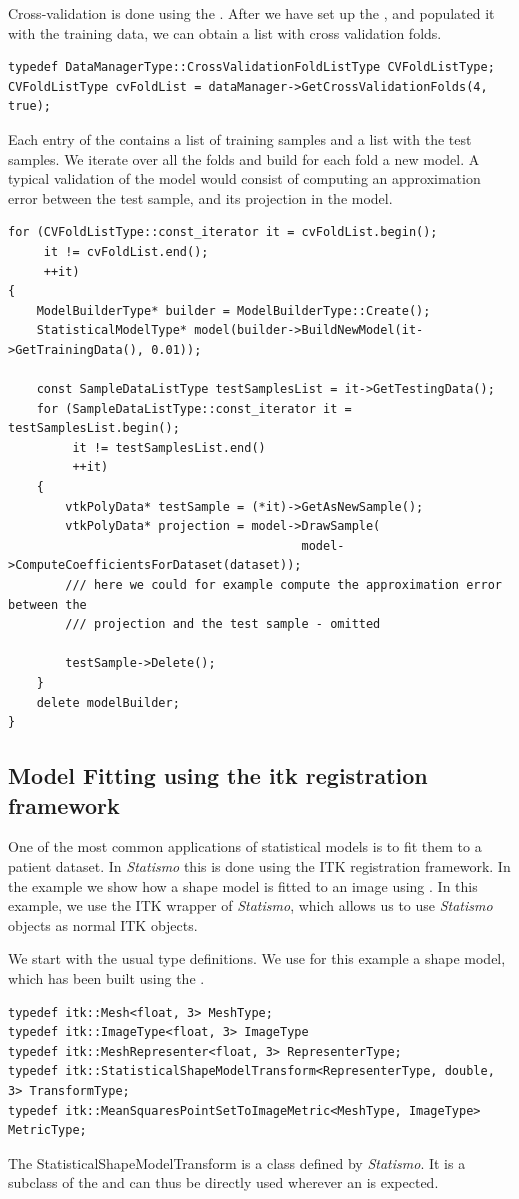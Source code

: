 \documentclass{InsightArticle}
\newcommand{\Statismo}{\emph{Statismo}\xspace}
\begin{document}
Cross-validation is done using the . 
After we have set up the , and populated it with the training data, we 
can obtain a list with cross validation folds. 
\begin{verbatim}
typedef DataManagerType::CrossValidationFoldListType CVFoldListType;
CVFoldListType cvFoldList = dataManager->GetCrossValidationFolds(4, true);
\end{verbatim}
Each entry of the  contains a list of training samples and a list with the test samples. 
We iterate over all the folds and build for each fold a new model. A typical validation of the model would 
consist of computing an approximation error between the test sample, and its projection in the model. 
\begin{verbatim}
for (CVFoldListType::const_iterator it = cvFoldList.begin();
     it != cvFoldList.end();
     ++it)
{
    ModelBuilderType* builder = ModelBuilderType::Create();
    StatisticalModelType* model(builder->BuildNewModel(it->GetTrainingData(), 0.01));

    const SampleDataListType testSamplesList = it->GetTestingData();
    for (SampleDataListType::const_iterator it = testSamplesList.begin();
         it != testSamplesList.end()
         ++it)
    {
        vtkPolyData* testSample = (*it)->GetAsNewSample();
        vtkPolyData* projection = model->DrawSample(
                                         model->ComputeCoefficientsForDataset(dataset));
        /// here we could for example compute the approximation error between the 
        /// projection and the test sample - omitted

        testSample->Delete();
    }
    delete modelBuilder;
}

\end{verbatim}

\subsection{Model Fitting using the itk registration framework}\label{sec:model-fitting}
One of the most common applications of statistical models is to fit them to a patient dataset. 
In \Statismo this is done using the ITK registration framework. In the example 
we show how a shape model is fitted to an image using . 
In this example, we use the ITK wrapper of \Statismo, which allows us to use \Statismo objects as normal ITK objects.

We start with the usual type definitions. We use for this example a shape model, which has been 
built using the . 
\begin{verbatim}
typedef itk::Mesh<float, 3> MeshType;
typedef itk::ImageType<float, 3> ImageType
typedef itk::MeshRepresenter<float, 3> RepresenterType;
typedef itk::StatisticalShapeModelTransform<RepresenterType, double, 3> TransformType;
typedef itk::MeanSquaresPointSetToImageMetric<MeshType, ImageType> MetricType;
\end{verbatim}
The StatisticalShapeModelTransform is a class defined by \Statismo. It is a subclass of the 
and can thus be directly used wherever an  is expected. 
\end{document}

